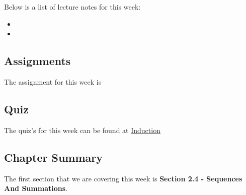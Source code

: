 \noindent Below is a list of lecture notes for this week:

\begin{itemize}
    \item {}
    \item {}
\end{itemize}

\subsection{Assignments}

The assignment for this week is   

\subsection{Quiz}

The quiz's for this week can be found at \href{https://applied.cs.colorado.edu/mod/quiz/view.php?id=51773}{Induction}  

\subsection{Chapter Summary}

The first section that we are covering this week is \textbf{Section 2.4 - Sequences And Summations}.

